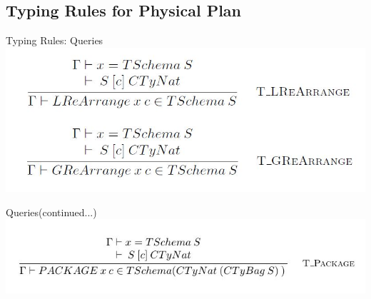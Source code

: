 \subsection{Typing Rules for Physical Plan}
\begin{frame}{Typing Rules: Queries}
\centering
\includegraphics[scale=0.4]{Images/TypingRules/ReArrange.JPG}
\end{frame}

\begin{frame}{Queries(continued...)}
\centering
\includegraphics[scale=0.4]{Images/TypingRules/Package.JPG}
\end{frame}


